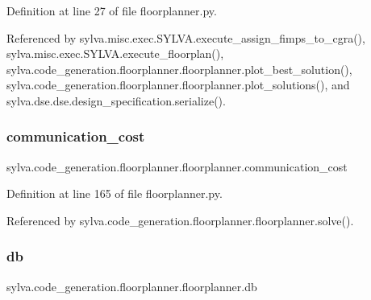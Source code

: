 Definition at line 27 of file floorplanner.\+py.



Referenced by sylva.\+misc.\+exec.\+S\+Y\+L\+V\+A.\+execute\+\_\+assign\+\_\+fimps\+\_\+to\+\_\+cgra(), sylva.\+misc.\+exec.\+S\+Y\+L\+V\+A.\+execute\+\_\+floorplan(), sylva.\+code\+\_\+generation.\+floorplanner.\+floorplanner.\+plot\+\_\+best\+\_\+solution(), sylva.\+code\+\_\+generation.\+floorplanner.\+floorplanner.\+plot\+\_\+solutions(), and sylva.\+dse.\+dse.\+design\+\_\+specification.\+serialize().

\mbox{\label{classsylva_1_1code__generation_1_1floorplanner_1_1floorplanner_ae89f7aced7d800c839f2b765ccef8e17}} 
\subsubsection{\texorpdfstring{communication\+\_\+cost}{communication\_cost}}
{\footnotesize\ttfamily sylva.\+code\+\_\+generation.\+floorplanner.\+floorplanner.\+communication\+\_\+cost}



Definition at line 165 of file floorplanner.\+py.



Referenced by sylva.\+code\+\_\+generation.\+floorplanner.\+floorplanner.\+solve().

\mbox{\label{classsylva_1_1code__generation_1_1floorplanner_1_1floorplanner_a51d125ec34729ef82c7ab89ca2f9ee36}} 
\subsubsection{\texorpdfstring{db}{db}}
{\footnotesize\ttfamily sylva.\+code\+\_\+generation.\+floorplanner.\+floorplanner.\+db}



